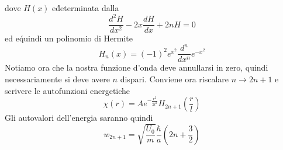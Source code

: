 \documentclass[a4paper]{article}
\begin{document}
        dove $H(x)$ e\' determinata dalla
        \begin{equation*}
            \frac{d^2H}{dx^2}-2x\frac{dH}{dx}+2nH=0
        \end{equation*}
        ed e\' quindi un polinomio di Hermite
        \begin{equation*}
            H_n(x)=(-1)^2e^{x^2}\frac{d^n}{dx^n}e^{-x^2}
        \end{equation*}
        Notiamo ora che la nostra funzione d'onda deve annullarsi in zero, quindi necessariamente si deve avere $n$ dispari.
        Conviene ora riscalare $n\to 2n+1$ e scrivere le autofunzioni energetiche
        \begin{equation*}
            \chi(r)=Ae^{-\frac{r^2}{2l^2}}H_{2n+1}\left(\frac{r}{l}\right)
        \end{equation*}
        Gli autovalori dell'energia saranno quindi
        \begin{equation*}
            w_{2n+1}=\sqrt{\frac{U_0}{m}}\frac{\hbar}{a}\left(2n+\frac{3}{2}\right)
        \end{equation*}
\end{document}
